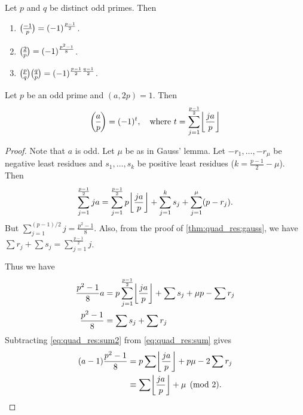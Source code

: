 \begin{theorem} \label{thm:quad_res:reciprocity}
    Let $p$ and $q$ be distinct odd primes.
    Then
    \begin{enumerate}
        \item $\lgnd{-1}{p} = (-1)^{\frac{p-1}{2}}$.
        \item $\lgnd 2 p = (-1)^{\frac{p^2 - 1}{8}}$.
        \item $\lgnd{p}{q} \lgnd{q}{p}
            = (-1)^{\frac{p-1}{2} \frac{q-1}{2}}$.
    \end{enumerate}
\end{theorem}
\begin{lemma}
    Let $p$ be an odd prime and $(a, 2p) = 1$.
    Then \[
        \lgnd a p = (-1)^t, \quad \text{where } t
            = \sum_{j=1}^{\frac{p-1}{2}} \floor{\frac{ja}{p}}
    \]
\end{lemma}
\begin{proof}
    Note that $a$ is odd.
    Let $\mu$ be as in Gauss' lemma.
    Let $-r_1, \dots, -r_\mu$ be negative least residues and
    $s_1, \dots, s_k$ be positive least residues ($k = \frac{p-1}{2} - \mu$).
    Then \[
        \sum_{j=1}^{\frac{p-1}{2}} ja = \sum_{j=1}^{\frac{p-1}{2}} p \floor{\frac{ja}{p}} + \sum_{j=1}^{k} s_j + \sum_{j=1}^{\mu} (p - r_j).
    \] But $\sum_{j=1}^{(p-1)/2} j = \frac{p^2 - 1}{8}$.
    Also, from the proof of \cref{thm:quad_res:gauss}, we have
    $\sum r_j + \sum s_j = \sum_{j=1}^{\frac{p-1}{2}} j$.

    Thus we have \begin{align}
        \frac{p^2 - 1}{8} a
            &= p \sum_{j=1}^{\frac{p-1}{2}} \floor{\frac{ja}{p}}
            + \sum s_j + \mu p - \sum r_j \label{eq:quad_res:sum} \\
        \frac{p^2 - 1}{8} &= \sum s_j + \sum r_j \label{eq:quad_res:sum2}
    \end{align}
    Subtracting \cref{eq:quad_res:sum2} from \cref{eq:quad_res:sum} gives
    \begin{align*}
        (a - 1) \frac{p^2 - 1}{8}
            &= p \sum \floor{\frac{ja}{p}} + p \mu - 2 \sum r_j \\
            &\equiv \sum \floor{\frac{ja}{p}} + \mu \pmod 2.
    \end{align*}
\end{proof}
